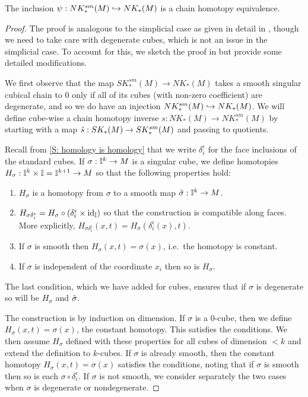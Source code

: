 \begin{proposition}\label{P: singular smooth cubes}
The inclusion $\psi: NK^{sm}_*(M) \hookrightarrow NK_*(M)$ is a chain homotopy equivalence.
\end{proposition}
\begin{proof}
The proof is analogous to the simplicial case as given in detail in \cite[Theorem 18.7]{Lee13}, though we need to take care with degenerate cubes, which is not an issue in the simplicial case. To account for this, we sketch the proof in \cite{Lee13} but provide some detailed modifications.

We first observe that the map $SK^{sm}_*(M) \to NK_*(M)$ takes a smooth singular cubical chain to $0$ only if all of its cubes (with non-zero coefficient) are degenerate, and so we do have an injection $NK^{sm}_*(M) \hookrightarrow NK_*(M)$. We will define cube-wise a chain homotopy inverse $s \colon NK_*(M) \to NK^{sm}_*(M)$ by starting with a map $\tilde s:SK_*(M) \to SK^{sm}_*(M)$ and passing to quotients.

Recall from \cref{S: homology is homology} that we write $\delta_i^\epsilon$ for the face inclusions of the standard cubes. If $\sigma:\mathbb{I}^k \to M$ is a singular cube, we define homotopies $H_\sigma:\mathbb{I}^k \times \mathbb{I} = \mathbb{I}^{k+1} \to M$ so that the following properties hold:
\begin{enumerate}
\item\label{I: smooth} $H_\sigma$ is a homotopy from $\sigma$ to a smooth map $\tilde \sigma:\mathbb{I}^k \to M$.

\item\label{I: faces} $H_{\sigma \delta_i^\epsilon} = H_\sigma \circ (\delta_i^\epsilon \times \mathrm{id}_{\mathbb{I}})$ so that the construction is compatible along faces. More explicitly, $H_{\sigma \delta_i^\epsilon}(x,t) = H_\sigma(\delta_i^\epsilon(x),t)$.

\item If $\sigma$ is smooth then $H_{\sigma}(x,t) = \sigma(x)$, i.e.\ the homotopy is constant.

\item\label{I: degen} If $\sigma$ is independent of the coordinate $x_i$ then so is $H_\sigma$.
\end{enumerate}

The last condition, which we have added for cubes, ensures that if $\sigma$ is degenerate so will be $H_\sigma$ and $\tilde \sigma$.

The construction is by induction on dimension. If $\sigma$ is a $0$-cube, then we define $H_\sigma(x,t) = \sigma(x)$, the constant homotopy. This satisfies the conditions. We then assume $H_\sigma$ defined with these properties for all cubes of dimension $<k$ and extend the definition to $k$-cubes. If $\sigma$ is already smooth, then the constant homotopy $H_\sigma(x,t) = \sigma(x)$ satisfies the conditions, noting that if $\sigma$ is smooth then so is each $\sigma \circ \delta_i^\epsilon$. If $\sigma$ is not smooth, we consider separately the two cases when $\sigma$ is degenerate or nondegenerate.


\end{proof}
